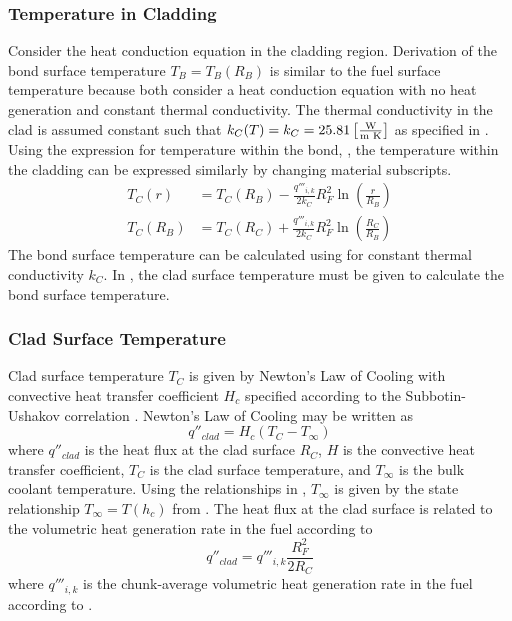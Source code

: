     \subsubsection{Temperature in Cladding}
      Consider the heat conduction equation in the cladding region. Derivation
      of the bond surface temperature $T_B=T_B(R_B)$ is similar to
      the fuel surface temperature because both consider a heat conduction
      equation with no heat generation and constant thermal conductivity.
      The
      thermal conductivity in the clad is assumed constant such that $k_C(T) =
      k_C = 25.81 \left[\text{{$\frac{\text{W}}{\text{m K}}$}}\right]$ as specified in
      .
      Using the expression for temperature within the bond,
      , the temperature within the cladding can be expressed
      similarly by changing material subscripts. 
      \begin{align}
        \label{eq:tcr}
        T_C(r) &= T_C(R_B) - \frac{q'''_{i,k}}{2 k_C} R_F^2
          \ln\left(\frac{r}{R_B}\right) \\
        \label{eq:tb_forward}
        T_C(R_B) &= T_C(R_C) + \frac{q'''_{i,k}}{2 k_C} R_F^2
          \ln\left(\frac{R_C}{R_B}\right)
      \end{align}
      The bond surface temperature can be calculated using 
      for constant thermal conductivity $k_C$. In , the clad
      surface temperature must be given to calculate the bond surface
      temperature.

    \subsubsection{Clad Surface Temperature}
      Clad surface temperature $T_C$ is given by Newton's Law of Cooling with
      convective heat transfer coefficient $H_c$ specified according to the
      Subbotin-Ushakov correlation \cite{subbotinUshakov}. Newton's Law of 
      Cooling may be written as
      \begin{equation}
        q''_{clad} = H_c (T_C - T_{\infty})
      \end{equation}
      where $q''_{clad}$ is the heat flux at the clad surface $R_C$, $H$ is
      the convective heat transfer coefficient, $T_C$ is the clad surface
      temperature, and $T_{\infty}$ is the bulk coolant temperature. Using the
      relationships in , $T_{\infty}$ is given
      by the state relationship $T_{\infty} = T(h_c)$ from \cite{sodiumProp}.
      The heat flux at the clad surface is related to the volumetric heat 
      generation rate in the fuel according to 
      \begin{equation}
        q''_{clad} = q'''_{i,k} \frac{R_F^2}{2 R_C}
      \end{equation}
      where $q'''_{i,k}$ is the chunk-average volumetric heat generation rate 
      in the fuel according to .

